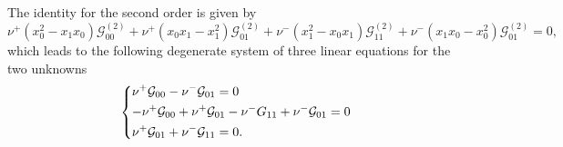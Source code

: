 \documentclass[a4paper, 11pt]{article}
\begin{document}
The identity for the second order is given by
\begin{equation*}
  \nu^+(x_0^2-x_1x_0)\mathcal G^{(2)}_{00} + \nu^+(x_0x_1-x_1^2)\mathcal G_{01}^{(2)}+\nu^-(x_1^2-x_0x_1)\mathcal G_{11}^{(2)} + \nu^-(x_1x_0-x_0^2)\mathcal G_{01}^{(2)} = 0,
\end{equation*}
which leads to the following degenerate system of three linear equations for the two unknowns
\begin{equation*}
  \begin{dcases}
    \nu^+\mathcal G_{00} - \nu^-\mathcal G_{01} = 0\\
    -\nu^+\mathcal G_{00} + \nu^+\mathcal G_{01} - \nu^-G_{11} + \nu^-\mathcal G_{01} = 0\\
    \nu^+\mathcal G_{01} + \nu^-\mathcal G_{11} = 0.
  \end{dcases}
\end{equation*}
\end{document}
